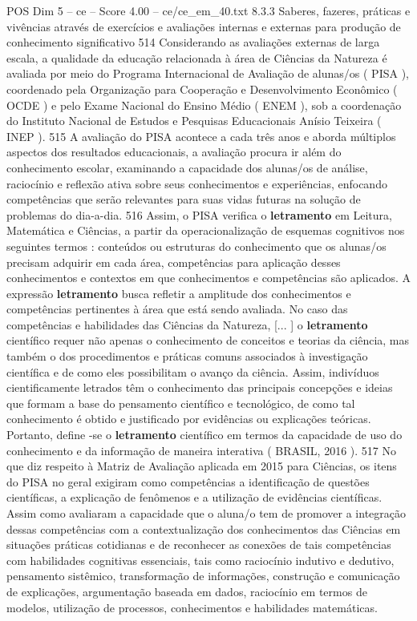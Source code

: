 \begin{textsample}{POS Dim 5 – ce – Score 4.00 – ce/ce\_em\_40.txt}  \label{ex:f5_pos_257}
8.3.3 Saberes, fazeres, práticas e vivências através de exercícios e avaliações internas e externas para produção de conhecimento significativo 514 Considerando as avaliações externas de larga escala, a qualidade da educação relacionada à área de Ciências da Natureza é avaliada por meio do Programa Internacional de Avaliação de alunas/os ( PISA ), coordenado pela Organização para Cooperação e Desenvolvimento Econômico ( OCDE ) e pelo Exame Nacional do Ensino Médio ( ENEM ), sob a coordenação do Instituto Nacional de Estudos e Pesquisas Educacionais Anísio Teixeira ( INEP ). 515 A avaliação do PISA acontece a cada três anos e aborda múltiplos aspectos dos resultados educacionais, a avaliação procura ir além do conhecimento escolar, examinando a capacidade dos alunas/os de análise, raciocínio e reflexão ativa sobre seus conhecimentos e experiências, enfocando competências que serão relevantes para suas vidas futuras na solução de problemas do dia-a-dia. 516 Assim, o PISA verifica o \textbf{letramento} em Leitura, Matemática e Ciências, a partir da operacionalização de esquemas cognitivos nos seguintes termos : conteúdos ou estruturas do conhecimento que os alunas/os precisam adquirir em cada área, competências para aplicação desses conhecimentos e contextos em que conhecimentos e competências são aplicados.
A expressão \textbf{letramento} busca refletir a amplitude dos conhecimentos e competências pertinentes à área que está sendo avaliada.
No caso das competências e habilidades das Ciências da Natureza, [... ] o \textbf{letramento} científico requer não apenas o conhecimento de conceitos e teorias da ciência, mas também o dos procedimentos e práticas comuns associados à investigação científica e de como eles possibilitam o avanço da ciência.
Assim, indivíduos cientificamente letrados têm o conhecimento das principais concepções e ideias que formam a base do pensamento científico e tecnológico, de como tal conhecimento é obtido e justificado por evidências ou explicações teóricas.
Portanto, define -se o \textbf{letramento} científico em termos da capacidade de uso do conhecimento e da informação de maneira interativa ( BRASIL, 2016 ). 517 No que diz respeito à Matriz de Avaliação aplicada em 2015 para Ciências, os itens do PISA no geral exigiram como competências a identificação de questões científicas, a explicação de fenômenos e a utilização de evidências científicas.
Assim como avaliaram a capacidade que o aluna/o tem de promover a integração dessas competências com a contextualização dos conhecimentos das Ciências em situações práticas cotidianas e de reconhecer as conexões de tais competências com habilidades cognitivas essenciais, tais como raciocínio indutivo e dedutivo, pensamento sistêmico, transformação de informações, construção e comunicação de explicações, argumentação baseada em dados, raciocínio em termos de modelos, utilização de processos, conhecimentos e habilidades matemáticas.

\end{textsample}
